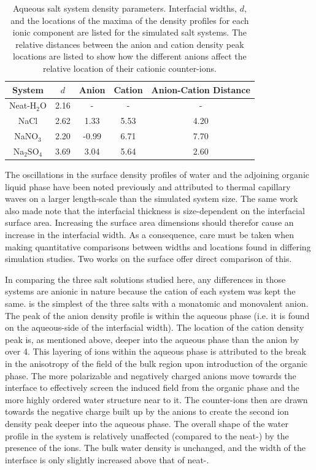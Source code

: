 \begin{table}[htdp]
	\begin{center}
	\begin{tabular}{|c||c|c|c|c|}
		\hline
		System & $d$ & Anion & Cation & Anion-Cation Distance \\ \hline
		Neat-H$_2$O & 2.16 & - & - & - \\ 
		NaCl & 2.62 & 1.33 & 5.53 & 4.20 \\
		NaNO$_3$ & 2.20 & -0.99 & 6.71 & 7.70 \\
		Na$_2$SO$_4$ & 3.69 & 3.04 & 5.64 & 2.60 \\
		\hline
	\end{tabular}
	\end{center}
	\caption{Aqueous salt system density parameters. Interfacial widths, $d$, and the locations of the maxima of the density profiles for each ionic component are listed for the simulated salt systems. The relative distances between the anion and cation density peak locations are listed to show how the different anions affect the relative location of their cationic counter-ions.}
	\label{table:double-layer}
\end{table}

The oscillations in the surface density profiles of water and the adjoining organic \ctc liquid phase have been noted previously and attributed to thermal capillary waves on a larger length-scale than the simulated system size.\cite{Chang1996} The same work also made note that the interfacial thickness is size-dependent on the interfacial surface area. Increasing the surface area dimensions should therefor cause an increase in the interfacial width. As a consequence, care must be taken when making quantitative comparisons between widths and locations found in differing simulation studies. Two works on the \ctcwat surface offer direct comparison of this.\cite{Chang1996,Hore2008}

In comparing the three salt solutions studied here, any differences in those systems are anionic in nature because the cation of each system was kept the same. \nacl is the simplest of the three salts with a monatomic and monovalent anion. The peak of the anion density profile is within the aqueous phase (i.e. it is found on the aqueous-side of the interfacial width). The location of the cation density peak is, as mentioned above, deeper into the aqueous phase than the anion by over 4\angs. This layering of ions within the aqueous phase is attributed to the break in the anisotropy of the field of the bulk region upon introduction of the organic phase. The more polarizable and negatively charged anions move towards the interface to effectively screen the induced field from the organic phase and the more highly ordered water structure near to it. The counter-ions then are drawn towards the negative charge built up by the anions to create the second ion density peak deeper into the aqueous phase. The overall shape of the water profile in the \nacl system is relatively unaffected (compared to the neat-\wat) by the presence of the ions. The bulk water density is unchanged, and the width of the interface is only slightly increased above that of neat-\wat.

